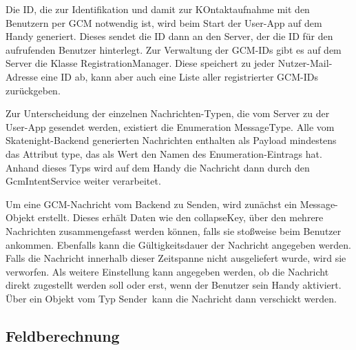 Die ID, die zur Identifikation und damit zur KOntaktaufnahme mit den Benutzern per GCM notwendig ist, wird beim Start der User-App auf dem Handy generiert. Dieses sendet die ID dann an den Server, der die ID für den aufrufenden Benutzer hinterlegt. Zur Verwaltung der GCM-IDs gibt es auf dem Server die Klasse \glqq RegistrationManager\grqq. Diese speichert zu jeder Nutzer-Mail-Adresse eine ID ab, kann aber auch eine Liste aller registrierter GCM-IDs zurückgeben.

Zur Unterscheidung der einzelnen Nachrichten-Typen, die vom Server zu der User-App gesendet werden, existiert die Enumeration MessageType. Alle vom Skatenight-Backend generierten Nachrichten enthalten als Payload mindestens das Attribut \glqq type\grqq, das als Wert den Namen des Enumeration-Eintrags hat. Anhand dieses Typs wird auf dem Handy die Nachricht dann durch den GcmIntentService weiter verarbeitet.

Um eine GCM-Nachricht vom Backend zu Senden, wird zunächst ein Message-Objekt erstellt. Dieses erhält Daten wie den \glqq collapseKey\grqq, über den mehrere Nachrichten zusammengefasst werden können, falls sie stoßweise beim Benutzer ankommen. Ebenfalls kann die Gültigkeitsdauer der Nachricht angegeben werden. Falls die Nachricht innerhalb dieser Zeitspanne nicht ausgeliefert wurde, wird sie verworfen. Als weitere Einstellung kann angegeben werden, ob die Nachricht direkt zugestellt werden soll oder erst, wenn der Benutzer sein Handy aktiviert. Über ein Objekt vom Typ \glqq Sender\grqq\ kann die Nachricht dann verschickt werden.

\subsection{Feldberechnung}
\label{subsec:Feldberechnung}